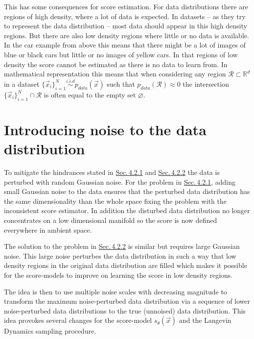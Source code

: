 This has some consequences for score estimation. For data distributions there are regions of high density, where a lot of data is expected. In datasets – as they try to represent the data distribution – most data should appear in this high density regions. But there are also low density regions where little or no data is available. In the car example from above this means that there might be a lot of images of blue or black cars but little or no images of yellow cars. In that regions of low density the score cannot be estimated as there is no data to learn from. In mathematical representation this means that when considering any region $\mathcal{R}\subset\mathbb{R}^d$ in a dataset $\{\vec{x}_i\}_{i=1}^N\overset{i.i.d}{\sim}p_{data}(\vec{x})$ such that $p_{data}(\mathcal{R})\approx0$ the intersection $\{\vec{x}_i\}_{i=1}^N\cap\mathcal{R}$ is often equal to the empty set $\varnothing$. 

\section[Introducing noise to the data distribution]{Introducing noise to the data distribution%
    } \label{sec:4.3}
To mitigate the hindrances stated in \hyperref[sec:4.2.1]{Sec.\,4.2.1} and \hyperref[sec:4.2.2]{Sec.\,4.2.2} the data is perturbed with random Gaussian noise. For the problem in \hyperref[sec:4.2.1]{Sec.\,4.2.1}, adding small Gaussian noise to the data ensures that the perturbed data distribution has the same dimensionality than the whole space fixing the problem with the inconsistent score estimator. In addition the disturbed data distribution no longer concentrates on a low dimensional manifold so the score is now defined everywhere in ambient space.

The solution to the problem in \hyperref[sec:4.2.2]{Sec.\,4.2.2} is similar but requires large Gaussian noise. This large noise perturbes the data distribution in such a way that low density regions in the original data distribution are filled which makes it possible for the score-models to improve on learning the score in low density regions.

The idea is then to use multiple noise scales with decreasing magnitude to transform the maximum noise-perturbed data distribution via a sequence of lower noise-perturbed data distributions to the true (unnoised) data distribution. This idea provokes several changes for the score-model $s_\theta(\vec{x})$ and the Langevin Dynamics sampling procedure. 
%
